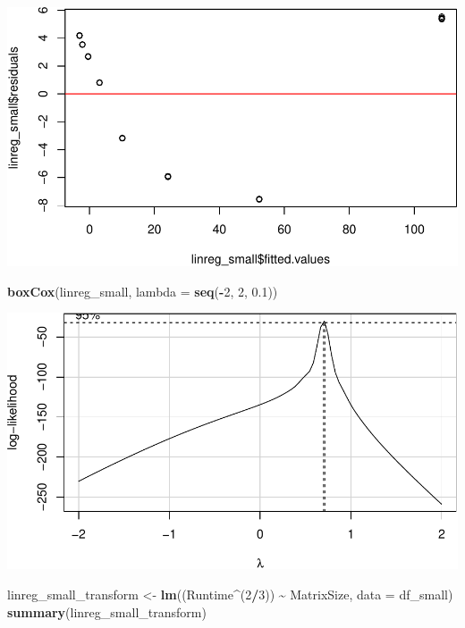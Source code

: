 \documentclass[
]{article}
\newenvironment{Shaded}{\begin{snugshade}}{\end{snugshade}}
\newcommand{\DataTypeTok}[1]{\textcolor[rgb]{0.13,0.29,0.53}{#1}}
\newcommand{\DecValTok}[1]{\textcolor[rgb]{0.00,0.00,0.81}{#1}}
\newcommand{\FloatTok}[1]{\textcolor[rgb]{0.00,0.00,0.81}{#1}}
\newcommand{\KeywordTok}[1]{\textcolor[rgb]{0.13,0.29,0.53}{\textbf{#1}}}
\newcommand{\NormalTok}[1]{#1}
\newcommand{\OperatorTok}[1]{\textcolor[rgb]{0.81,0.36,0.00}{\textbf{#1}}}
\newcommand{\StringTok}[1]{\textcolor[rgb]{0.31,0.60,0.02}{#1}}
\begin{document}
\includegraphics{main_files/figure-latex/unnamed-chunk-16-1.pdf}

\begin{Shaded}
\begin{Highlighting}[]
\KeywordTok{boxCox}\NormalTok{(linreg\_small, }\DataTypeTok{lambda =} \KeywordTok{seq}\NormalTok{(}\OperatorTok{{-}}\DecValTok{2}\NormalTok{, }\DecValTok{2}\NormalTok{, }\FloatTok{0.1}\NormalTok{))}
\end{Highlighting}
\end{Shaded}

\includegraphics{main_files/figure-latex/unnamed-chunk-16-2.pdf}

\begin{Shaded}
\begin{Highlighting}[]
\NormalTok{linreg\_small\_transform \textless{}{-}}\StringTok{ }\KeywordTok{lm}\NormalTok{((Runtime}\OperatorTok{\^{}}\NormalTok{(}\DecValTok{2}\OperatorTok{/}\DecValTok{3}\NormalTok{)) }\OperatorTok{\textasciitilde{}}\StringTok{ }\NormalTok{MatrixSize, }\DataTypeTok{data =}\NormalTok{ df\_small)}
\KeywordTok{summary}\NormalTok{(linreg\_small\_transform)}
\end{Highlighting}
\end{Shaded}
\end{document}
